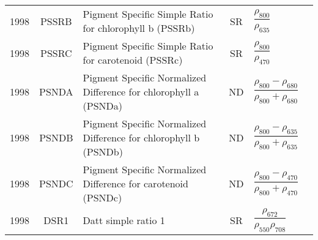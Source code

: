 \documentclass[10pt]{article}
\begin{document}
\begin{ThreePartTable}
\begin{longtable}{c c m{2.3in} c M{2.8in} M{1.5in}}
  1998 & PSSRB   & Pigment Specific Simple Ratio for chlorophyll b (PSSRb)                        & SR & $\dfrac{\rho_{800}}{\rho_{635}}$                                                                                                                                                                                                                                                        & \citet{Blackburn1998a,Blackburn1998b}               \\
  1998 & PSSRC   & Pigment Specific Simple Ratio for carotenoid (PSSRc)                           & SR & $\dfrac{\rho_{800}}{\rho_{470}}$                                                                                                                                                                                                                                                        & \citet{Blackburn1998a,Blackburn1998b}               \\
  1998 & PSNDA   & Pigment Specific Normalized Difference for chlorophyll a (PSNDa)               & ND & $\dfrac{\rho_{800}-\rho_{680}}{\rho_{800}+\rho_{680}}$                                                                                                                                                                                                                                  & \citet{Blackburn1998a,Blackburn1998b}               \\
  1998 & PSNDB   & Pigment Specific Normalized Difference for chlorophyll b (PSNDb)               & ND & $\dfrac{\rho_{800}-\rho_{635}}{\rho_{800}+\rho_{635}}$                                                                                                                                                                                                                                  & \citet{Blackburn1998a,Blackburn1998b}               \\
  1998 & PSNDC   & Pigment Specific Normalized Difference for carotenoid (PSNDc)                  & ND & $\dfrac{\rho_{800}-\rho_{470}}{\rho_{800}+\rho_{470}}$                                                                                                                                                                                                                                  & \citet{Blackburn1998a,Blackburn1998b}               \\
  1998 & DSR1    & Datt simple ratio 1                                                            & SR & $\dfrac{\rho_{672}}{\rho_{550}\rho_{708}}$                                                                                                                                                                                                                                              & \citet{Datt1998}                                    \\

\end{longtable}
\end{ThreePartTable}
\end{document}
